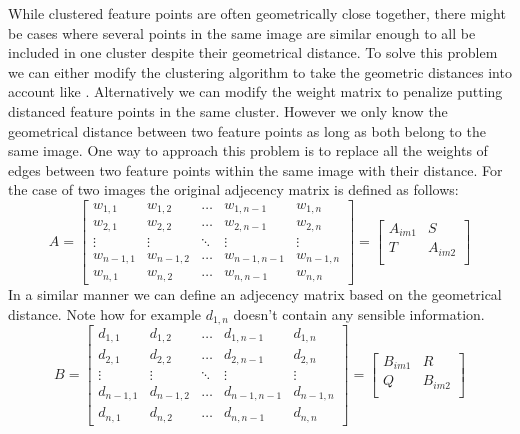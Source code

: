 \documentclass{article}
\begin{document}
While clustered feature points are often geometrically close together, 
there might be cases where several points in the same image are similar 
enough to all be included in one cluster despite their geometrical 
distance.  To solve this problem we can either modify the clustering 
algorithm to take the geometric distances into account like 
\cite{das2008event}.  Alternatively we can modify the weight matrix to 
penalize putting distanced feature points in the same cluster. However 
we only know the geometrical distance between two feature points as long 
as both belong to the same image. One way to approach this problem is to 
replace all the weights of edges between two feature points within the 
same image with their distance. For the case of two images the original 
adjecency matrix is defined as follows:
%
$$A=
\begin{bmatrix}
w_{1,1}   & w_{1,2}   & \ldots & w_{1,n-1}   & w_{1,n}     \\
w_{2,1}   & w_{2,2}   & \ldots & w_{2,n-1}   & w_{2,n}     \\
\vdots    & \vdots    & \ddots & \vdots      & \vdots      \\
w_{n-1,1} & w_{n-1,2} & \ldots & w_{n-1,n-1} & w_{n-1,n}   \\
w_{n,1}   & w_{n,2}   & \ldots & w_{n,n-1}   & w_{n,n}
\end{bmatrix}=
\begin{bmatrix}
A_{im1} & S       \\
T       & A_{im2} \\
\end{bmatrix}
$$
%
In a similar manner we can define an adjecency matrix based on the 
geometrical distance. Note how for example $d_{1,n}$ doesn't contain any 
sensible information.
%
$$B=
\begin{bmatrix}
d_{1,1}   & d_{1,2}   & \ldots & d_{1,n-1}   & d_{1,n}     \\
d_{2,1}   & d_{2,2}   & \ldots & d_{2,n-1}   & d_{2,n}     \\
\vdots    & \vdots    & \ddots & \vdots      & \vdots      \\
d_{n-1,1} & d_{n-1,2} & \ldots & d_{n-1,n-1} & d_{n-1,n}   \\
d_{n,1}   & d_{n,2}   & \ldots & d_{n,n-1}   & d_{n,n}
\end{bmatrix}=
\begin{bmatrix}
B_{im1} & R       \\
Q       & B_{im2} \\
\end{bmatrix}
$$
\end{document}
